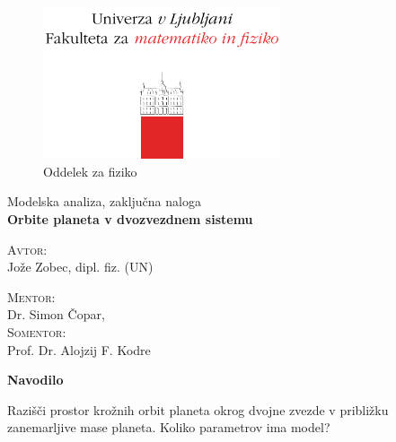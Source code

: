 \documentclass[12pt, a4paper]{article}
\newenvironment{navodilo}[1][1.0]
{
	\begin{center}
		{\bf Navodilo}\\[12pt]
		\begin{minipage}{#1\textwidth}
}
{
		\end{minipage}
	\end{center}
}
\begin{document}
\begin{titlepage}
	\begin{figure}[H]
		\centering
		\includegraphics[width = 7cm, keepaspectratio=1]{pics/logo.pdf}\\[12pt]
		{\sc Oddelek za fiziko}\\[4cm]
	\end{figure}
	\begin{center}
		\large{Modelska analiza, zaklju\v cna naloga}\\[0.5cm]
		\LARGE\textbf{Orbite planeta v dvozvezdnem sistemu}\\[1.0cm]

		\vspace{0.0cm}

		\begin{minipage}{0.4\textwidth}\small
			\begin{flushleft}
			\textsc{Avtor:}\\[0.2cm]
			Jo\v ze Zobec, dipl. fiz. (UN)
			\end{flushleft}
		\end{minipage}
		\begin{minipage}{0.4\textwidth}\small
			\begin{flushright}
				\textsc{Mentor:}\\[0.2cm]
				Dr. Simon \v Copar,\\[0.5cm]
				\textsc{Somentor:}\\[0.1cm]
				Prof. Dr. Alojzij F. Kodre
			\end{flushright}
		\end{minipage}
	\end{center}

	\vspace{3.5cm}

	\begin{navodilo}
		Razi\v s\v ci prostor kro\v znih orbit planeta okrog dvojne zvezde v pribli\v zku zanemarljive mase
		planeta. Koliko parametrov ima model?
	\end{navodilo}
	
	\vfill

\end{titlepage}
\end{document}
